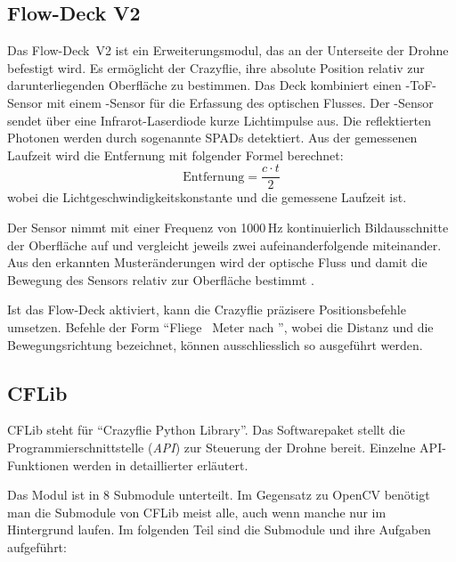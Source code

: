 \subsection{Flow-Deck V2}
\label{sub:v2}

Das Flow-Deck~V2 ist ein Erweiterungsmodul, das an der Unterseite der Drohne befestigt wird.
Es ermöglicht der Crazyflie, ihre absolute Position relativ zur darunterliegenden Oberfläche zu bestimmen.
Das Deck kombiniert einen -ToF-Sensor\footnotemark{} mit einem -Sensor für die Erfassung des optischen Flusses.
Der -Sensor sendet über eine Infrarot-Laserdiode kurze Lichtimpulse aus.
Die reflektierten Photonen werden durch sogenannte SPADs\footnotemark{} detektiert. 
Aus der gemessenen Laufzeit wird die Entfernung mit folgender Formel berechnet:
\[
\text{Entfernung} = \frac{c \cdot t}{2}
\]
wobei  die Lichtgeschwindigkeitskonstante und  die gemessene Laufzeit ist.

Der  Sensor nimmt mit einer Frequenz von 1000\,Hz kontinuierlich Bildausschnitte der Oberfläche auf und vergleicht jeweils zwei aufeinanderfolgende miteinander.
Aus den erkannten Musteränderungen wird der optische Fluss und damit die Bewegung des Sensors relativ zur Oberfläche bestimmt \cite{bc:fdv2_specs}.

Ist das Flow-Deck aktiviert, kann die Crazyflie präzisere Positionsbefehle umsetzen.
Befehle der Form \enquote{Fliege ~Meter nach }, wobei  die Distanz und  die Bewegungsrichtung bezeichnet, können ausschliesslich so ausgeführt werden.

\subsection{CFLib}
\label{sub:cflib}
CFLib steht für \enquote{Crazyflie Python Library}.
Das Softwarepaket stellt die Programmierschnittstelle (\textit{API}) zur Steuerung der Drohne bereit. 
Einzelne API-Funktionen werden in  detaillierter erläutert.

Das Modul ist in 8 Submodule unterteilt.
Im Gegensatz zu OpenCV benötigt man die Submodule von CFLib meist alle, auch wenn manche nur im Hintergrund laufen.
Im folgenden Teil sind die Submodule und ihre Aufgaben aufgeführt:

